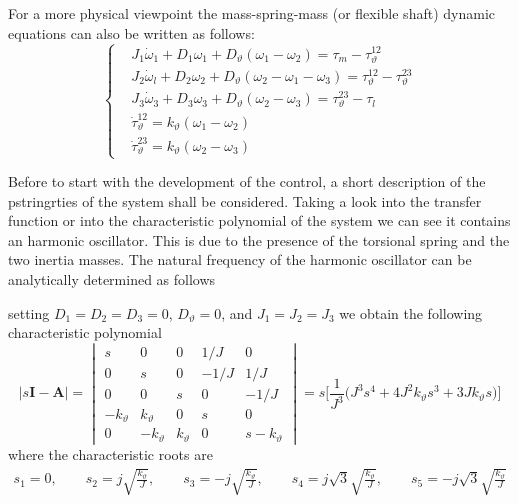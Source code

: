 \documentclass[12pt,a4paper]{scrartcl}
\begin{document}
\begin{onehalfspace}
\begin{mybox}
	\vspace{5mm}
	For a more physical viewpoint the mass-spring-mass (or flexible shaft) dynamic 
	equations can also be written as follows:
	\begin{equation}
		\left\lbrace 
		\begin{aligned}
			& J_1 \dot{\omega}_1 + D_1\omega_1 + D_{\vartheta} (\omega_1 - \omega_2) = \tau_m - \tau_{\vartheta}^{12} \\[6pt]
			& J_2 \dot{\omega}_l + D_2\omega_2 + D_{\vartheta} (\omega_2 - \omega_1 - \omega_3) = \tau_{\vartheta}^{12} - \tau_{\vartheta}^{23} \\[6pt]
			& J_3 \dot{\omega}_3 + D_3\omega_3 + D_{\vartheta} (\omega_2 - \omega_3) = \tau_{\vartheta}^{23} - \tau_l \\[6pt]
			& \dot{\tau}_{\vartheta}^{12} = k_{\vartheta}\left( \omega_1 - \omega_2\right) \\[6pt]
			& \dot{\tau}_{\vartheta}^{23} = k_{\vartheta}\left( \omega_2 - \omega_3\right) 
		\end{aligned}
		\right. 
	\end{equation}
\end{mybox}

Before to start with the development of the control, a short description of the pstringrties of the system shall be considered. Taking a look into the transfer function or into the characteristic polynomial of the system we can see it contains an harmonic oscillator. This is due to the presence of the torsional spring and the two inertia masses. The natural frequency of the harmonic oscillator can be analytically determined as follows

\noindent setting $D_1=D_2=D_3=0$, $D_\vartheta=0$, and $J_1 = J_2 = J_3$ we obtain the following characteristic polynomial
\begin{equation}
	\Big|s\mathbf{I}-{\mathbf{A}}\Big|=\begin{vmatrix}
		s & 0 & 0 & 1/J & 0 \\[6pt]
		0 & s & 0 & -1/J & 1/J \\[6pt]
		0 & 0 & s & 0 & -1/J \\[6pt]
		-k_{\vartheta} & k_{\vartheta} & 0 & s & 0 \\[6pt]
		0 & -k_{\vartheta} & k_{\vartheta} & 0 & s-k_\vartheta 
	\end{vmatrix} = s\Big[\frac{1}{J^3}\Big(J^3s^4+4J^2k_\vartheta s^3 + 3Jk_{\vartheta}s\Big)\Big]
\end{equation}
where the characteristic roots are
\begin{equation}
\begin{aligned}
	s_1 = 0, \qquad
	s_2 = j\sqrt{\frac{k_\vartheta}{J}}, \qquad
	s_3 = -j\sqrt{\frac{k_\vartheta}{J}}, \qquad
	s_4 = j\sqrt{3}\sqrt{\frac{k_\vartheta}{J}}, \qquad
	s_5 = -j\sqrt{3}\sqrt{\frac{k_\vartheta}{J}}
\end{aligned}
\end{equation}


\end{onehalfspace}
\end{document}
